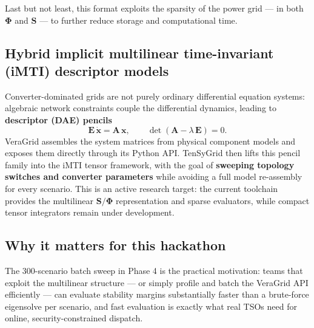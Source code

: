 \documentclass[11pt,a4paper]{article}
\begin{document}
Last but not least, this format exploits the sparsity of the power grid --- in both $\boldsymbol{\Phi}$ and $\mathbf{S}$ --- to further reduce storage and computational time.
\subsection*{Hybrid implicit multilinear time-invariant (iMTI) descriptor models}

Converter-dominated grids are not purely ordinary differential equation systems: algebraic network constraints couple the differential dynamics, leading to \textbf{descriptor (DAE) pencils}
\[
  \mathbf{E}\,\dot{\mathbf{x}} = \mathbf{A}\,\mathbf{x}, \qquad \det(\mathbf{A} - \lambda\,\mathbf{E}) = 0.
\]
VeraGrid assembles the system matrices from physical component models and exposes them directly through its Python API. TenSyGrid then lifts this pencil family into the iMTI tensor framework, with the goal of \textbf{sweeping topology switches and converter parameters} while avoiding a full model re-assembly for every scenario. This is an active research target: the current toolchain provides the multilinear $\mathbf{S}/\boldsymbol{\Phi}$ representation and sparse evaluators, while compact tensor integrators remain under development.

\subsection*{Why it matters for this hackathon}

The 300-scenario batch sweep in Phase 4 is the practical motivation: teams that exploit the multilinear structure --- or simply profile and batch the VeraGrid API efficiently --- can evaluate stability margins substantially faster than a brute-force eigensolve per scenario, and fast evaluation is exactly what real TSOs need for online, security-constrained dispatch.

\bigskip
\end{document}
